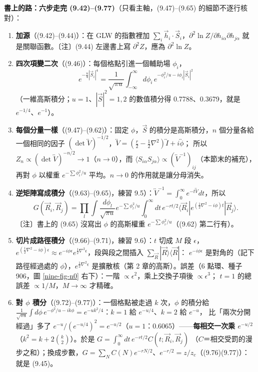 \textbf{書上的路：六步走完 (9.42)--(9.77)}（只看主軸，(9.47)--(9.65) 的細節不逐行核對）：
\begin{enumerate}[label=\textbf{\arabic*.},itemsep=0.1em,leftmargin=1.6em]
\item \textbf{加源}（(9.42)--(9.44)）：在 GLW 的指數裡加 $\sum_i\vec h_i\cdot\vec S_i$，$\partial^2\ln Z/\partial h_{i\alpha}\partial h_{j\alpha}$ 就是關聯函數。〔注〕(9.44) 左邊書上寫 $\partial^2Z$，應為 $\partial^2\ln Z$。
\item \textbf{四次項變二次}（(9.46)）：每個格點引進一個輔助場 $\phi_i$，
\[e^{-\frac u4|\vec S_i|^4}=\frac1{\sqrt{\pi u}}\int_{-\infty}^\infty d\phi_i\,e^{-\phi_i^2/u-i\phi_i|\vec S_i|^2}\tag{9.46}\]
（一維高斯積分；$u=1$、$|\vec S|^2=1,2$ 的數值積分得 0.7788、0.3679，就是 $e^{-1/4}$、$e^{-1}$）。
\item \textbf{每個分量一樣}（(9.47)--(9.62)）：固定 $\phi$，$\vec S$ 的積分是高斯積分，$n$ 個分量各給一個相同的因子 $(\det\overleftrightarrow V)^{-1/2}$，$\overleftrightarrow V=(\frac r2-\frac12\nabla^2)\overleftrightarrow I+i\overleftrightarrow\phi$；
所以 $Z_n\propto(\det\overleftrightarrow V)^{-n/2}\to1$（$n\to0$），而 $\langle S_{i\alpha}S_{j\alpha}\rangle\propto(\overleftrightarrow V^{-1})_{ij}$（本節末的補充），再對 $\phi$ 以權重 $e^{-\sum\phi_i^2/u}$ 平均。$n\to0$ 的作用就是讓分母消失。
\item \textbf{逆矩陣寫成積分}（(9.63)--(9.65)，練習 9.5）：$\overleftrightarrow V^{-1}=\int_0^\infty e^{-t\overleftrightarrow V}dt$，所以
\[G(\vec R_i,\vec R_j)=\prod_l\int\frac{d\phi_l}{\sqrt{\pi u}}e^{-\sum\phi_l^2/u}\int_0^\infty dt\,e^{-rt/2}\langle\vec R_i|e^{(\frac12\nabla^2-i\phi)t}|\vec R_j\rangle .\tag{9.65}\]
〔注〕書上的 (9.65) 沒寫出 $\phi$ 的高斯權重 $e^{-\sum\phi_i^2/u}$（(9.62) 第二行有）。
\item \textbf{切片成路徑積分}（(9.66)--(9.71)，練習 9.6）：$t$ 切成 $M$ 段 $\epsilon$，$e^{(\frac12\nabla^2-i\phi)\epsilon}\approx e^{-i\phi\epsilon}e^{\frac12\nabla^2\epsilon}$，段與段之間插入 $\sum_{\vec R}|\vec R\rangle\langle\vec R|$：
$e^{-i\phi\epsilon}$ 是對角的（記下路徑經過處的 $\phi$），$e^{\frac12\nabla^2\epsilon}$ 是擴散核（第 2 章的高斯）。誤差（6 點環、種子 906，圖 \ref{nine-fig-n0} 右下）：一階 $\propto\epsilon^2$，乘上交換子項後 $\propto\epsilon^3$；
$t=1$ 的總誤差 $\propto1/M$，$M\to\infty$ 才精確。
\item \textbf{對 $\phi$ 積分}（(9.72)--(9.77)）：一個格點被走過 $k$ 次，$\phi$ 的積分給 $\frac1{\sqrt{\pi u}}\int d\phi\,e^{-\phi^2/u-ik\phi}=e^{-uk^2/4}$：$k=1$ 給 $e^{-u/4}$、$k=2$ 給 $e^{-u}$，
比「兩次分開經過」多了 $e^{-u}/(e^{-u/4})^2=e^{-u/2}$（$u=1$：0.6065）——\textbf{每相交一次乘 $e^{-u/2}$}（$k^2=k+2\binom k2$）。於是 $G=\int_0^\infty dt\,e^{-rt/2}C(t;\vec R_i,\vec R_j)$
（$C$＝相交受罰的漫步之和）；換成步數，$G=\sum_NC(N)e^{-rN/2}$、$e^{-r/2}=z/z_c$（(9.76)(9.77)）：就是 (9.45)。
\end{enumerate}
